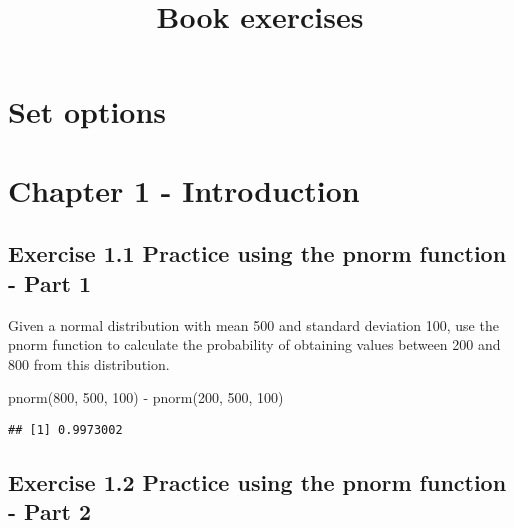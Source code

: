\documentclass[
]{article}
\title{Book exercises}
\author{}
\date{\vspace{-2.5em}}
\newenvironment{Shaded}{\begin{snugshade}}{\end{snugshade}}
\newcommand{\DecValTok}[1]{\textcolor[rgb]{0.00,0.00,0.81}{#1}}
\newcommand{\FunctionTok}[1]{\textcolor[rgb]{0.00,0.00,0.00}{#1}}
\newcommand{\NormalTok}[1]{#1}
\newcommand{\SpecialCharTok}[1]{\textcolor[rgb]{0.00,0.00,0.00}{#1}}
\begin{document}
\maketitle

{
\setcounter{tocdepth}{3}
\tableofcontents
}
\hypertarget{set-options}{%
\section*{Set options}\label{set-options}}

\hypertarget{chapter-1---introduction}{%
\section{Chapter 1 - Introduction}\label{chapter-1---introduction}}

\hypertarget{exercise-1.1-practice-using-the-pnorm-function---part-1}{%
\subsection{Exercise 1.1 Practice using the pnorm function - Part
1}\label{exercise-1.1-practice-using-the-pnorm-function---part-1}}

Given a normal distribution with mean 500 and standard deviation 100,
use the pnorm function to calculate the probability of obtaining values
between 200 and 800 from this distribution.

\begin{Shaded}
\begin{Highlighting}[]
\FunctionTok{pnorm}\NormalTok{(}\DecValTok{800}\NormalTok{, }\DecValTok{500}\NormalTok{, }\DecValTok{100}\NormalTok{) }\SpecialCharTok{{-}} \FunctionTok{pnorm}\NormalTok{(}\DecValTok{200}\NormalTok{, }\DecValTok{500}\NormalTok{, }\DecValTok{100}\NormalTok{)}
\end{Highlighting}
\end{Shaded}

\begin{verbatim}
## [1] 0.9973002
\end{verbatim}

\hypertarget{exercise-1.2-practice-using-the-pnorm-function---part-2}{%
\subsection{Exercise 1.2 Practice using the pnorm function - Part
2}\label{exercise-1.2-practice-using-the-pnorm-function---part-2}}
\end{document}
